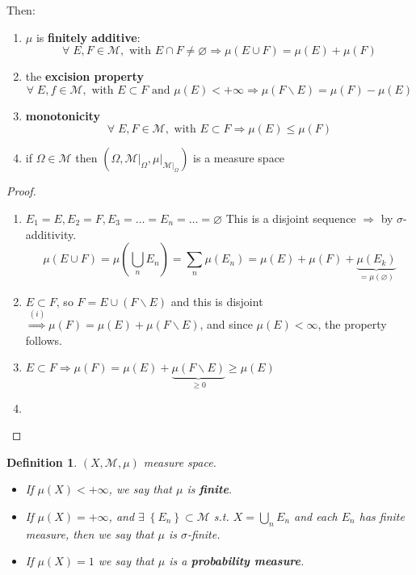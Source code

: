 \documentclass[a4paper,12pt]{article}
\theoremstyle{break}
\newtheorem{definition}{Definition}[section]
\let\emptyset\varnothing
\numberwithin{equation}{section}
\begin{document}
Then:
\begin{enumerate}
    \item \(\mu\) is \textbf{finitely additive}: 
    \[
        \forall \; E,F \in \mathcal{M}, \mbox{ with } E \cap F \not = \emptyset \Longrightarrow
    \mu(E \cup F) = \mu(E) + \mu(F)
    \]
    \item the \textbf{excision property}
    \[
        \forall \; E, f \in \mathcal{M}, \mbox{ with } E \subset F \mbox{ and } \mu(E) < +\infty \Longrightarrow \mu(F\backslash E) = \mu(F) - \mu(E)
    \]
    \item \textbf{monotonicity}
    \[
        \forall \; E, F \in \mathcal{M}, \mbox{ with } E \subset F \Longrightarrow \mu(E) \leq \mu(F)
    \]
    \item if \(\Omega \in \mathcal{M}\) then \((\Omega, \mathcal{M}\vert_{\Omega}, \mu\vert_{\mathcal{M}\vert_{\Omega}})\) is a measure space
\end{enumerate}
\begin{proof}
     \begin{enumerate}
        \item \(E_1 = E, E_2 = F, E_3 = \ldots = E_n = \ldots = \emptyset\) 
        This is a disjoint sequence \(\Longrightarrow\) by \(\sigma\)-additivity. 
        \[
            \mu(E \cup F) = \mu\left(\bigcup_{n} E_n\right) = \sum_n \mu(E_n) = \mu(E) + \mu(F) + \underbrace{\mu(E_k)}_{= \mu(\emptyset)}
        \] 
        \item \(E \subset F\), so \(F = E \cup (F \backslash E)\) and this is disjoint \(\overset{(i)}{\Longrightarrow} \mu(F) = \mu(E) + \mu(F\backslash E)\), and since \(\mu(E) < \infty\), the property follows.
        \item \(E \subset F \Longrightarrow \mu(F) = \mu(E) + \underbrace{\mu(F\backslash E)}_{\geq 0} \geq \mu(E)\)
        \item 
     \end{enumerate}
    \end{proof}
\begin{definition}
    \((X, \mathcal{M}, \mu)\) measure space. 
    \begin{itemize}
    \item If \(\mu(X) < +\infty\), we say that \(\mu\) is \textbf{finite}.

    \item If \(\mu (X) = +\infty\), and \(\exists \; \left\lbrace E_n \right\rbrace \subset \mathcal{M}\) s.t. \(X = \bigcup_n E_n\) and each \(E_n\) has finite measure, then we say that \(\mu\) is \(\sigma\)-finite. 

    \item If \(\mu(X) = 1\) we say that \(\mu\) is a \textbf{probability measure}.
    \end{itemize}
\end{definition}
\end{document}
